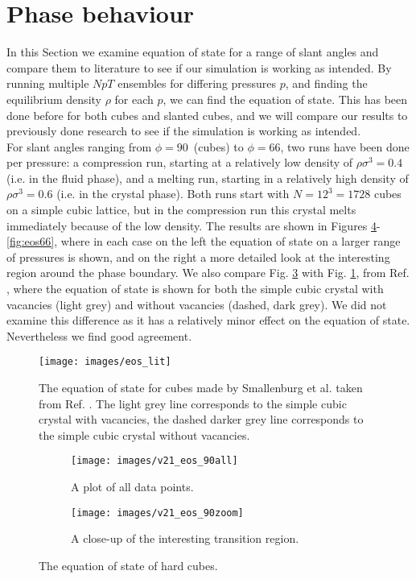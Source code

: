 \documentclass[thesis]{subfiles}
\begin{document}
\section{Phase behaviour}\label{subsec:eos}

In this Section we examine equation of state for a range of slant angles and compare them to literature to see if our simulation is working as intended. By running multiple $NpT$ ensembles for differing pressures $p$, and finding the equilibrium density $\rho$ for each $p$, we can find the equation of state. This has been done before for both cubes and slanted cubes\cite{van2017phase}, and we will compare our results to previously done research to see if the simulation is working as intended.\\

For slant angles ranging from $\phi = 90$\degr\ (cubes) to $\phi = 66$\degr, two runs have been done per pressure: a compression run, starting at a relatively low density of $\rho \sigma^3 = 0.4$ (i.e. in the fluid phase), and a melting run, starting in a relatively high density of $\rho \sigma^3 = 0.6$ (i.e. in the crystal phase). Both runs start with $N = 12^3 = 1728$ cubes on a simple cubic lattice, but in the compression run this crystal melts immediately because of the low density. The results are shown in Figures \ref{fig:eos90}-\ref{fig:eos66}, where in each case on the left the equation of state on a larger range of pressures is shown, and on the right a more detailed look at the interesting region around the phase boundary. We also compare Fig. \ref{fig:eos90-b} with Fig. \ref{fig:eos_lit}, from Ref. \cite{smallenburg2012vacancy}, where the equation of state is shown for both the simple cubic crystal with vacancies (light grey) and without vacancies (dashed, dark grey). We did not examine this difference as it has a relatively minor effect on the equation of state. Nevertheless we find good agreement. 

\begin{figure}[h]
	\centering
	\texttt{[image: images/eos\_lit]}
	\caption{The equation of state for cubes made by Smallenburg et al. taken from Ref. \cite{smallenburg2012vacancy}. The light grey line corresponds to the simple cubic crystal with vacancies, the dashed darker grey line corresponds to the simple cubic crystal without vacancies.}
	\label{fig:eos_lit}
\end{figure}

\begin{figure}[h]
	\begin{subfigure}[t]{0.475\textwidth}
		\texttt{[image: images/v21\_eos\_90all]}
		\caption{A plot of all data points.}
		\label{fig:eos90-a}
	\end{subfigure}\hfill
	\begin{subfigure}[t]{0.475\textwidth}
		\texttt{[image: images/v21\_eos\_90zoom]}
		\caption{A close-up of the interesting transition region.}
		\label{fig:eos90-b}
	\end{subfigure}
	\caption{The equation of state of hard cubes.}
	\label{fig:eos90}
\end{figure}
\end{document}

